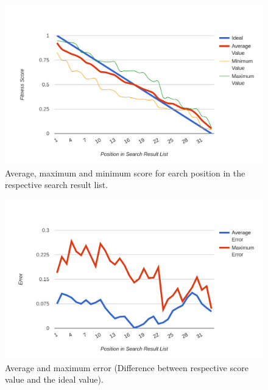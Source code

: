 \begin{figure}[H]
    \centering
    \includegraphics[width=\textwidth]{images/dist_avg.png}
    \caption[Diagram: Fitness Score Distribution (Processed)]{Average, maximum and minimum score for earch position in the respective search result list.}
    \label{fig:dist-avg}
\end{figure}

\begin{figure}[H]
    \centering
    \includegraphics[width=\textwidth]{images/dist_error.png}
    \caption[Diagram: Fitness Score Distribution (Error Rates)]{Average and maximum error (Difference between respective score value and the ideal value).}
    \label{fig:dist-err}
\end{figure}

